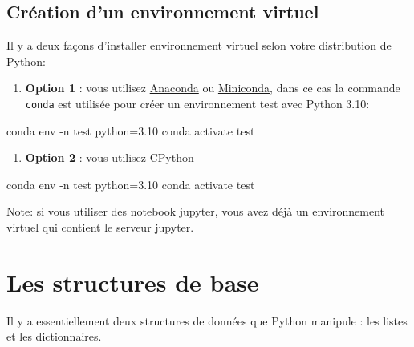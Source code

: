 \documentclass[
  letterpaper,
  DIV=11,
  numbers=noendperiod]{scrreprt}
\newenvironment{Shaded}{\begin{snugshade}}{\end{snugshade}}
\newcommand{\AttributeTok}[1]{\textcolor[rgb]{0.40,0.45,0.13}{#1}}
\newcommand{\ExtensionTok}[1]{\textcolor[rgb]{0.00,0.23,0.31}{#1}}
\newcommand{\NormalTok}[1]{\textcolor[rgb]{0.00,0.23,0.31}{#1}}
\providecommand{\tightlist}{%
  \setlength{\itemsep}{0pt}\setlength{\parskip}{0pt}}\usepackage{longtable,booktabs,array}
\begin{document}
\subsection{Création d'un environnement
virtuel}\label{cruxe9ation-dun-environnement-virtuel}

Il y a deux façons d'installer environnement virtuel selon votre
distribution de Python:

\begin{enumerate}
\def\labelenumi{\arabic{enumi}.}
\tightlist
\item
  \textbf{Option 1} : vous utilisez
  \href{https://www.anaconda.com/download}{Anaconda} ou
  \href{https://docs.anaconda.com/miniconda/miniconda-install/}{Miniconda},
  dans ce cas la commande \texttt{conda} est utilisée pour créer un
  environnement test avec Python 3.10:
\end{enumerate}

\begin{Shaded}
\begin{Highlighting}[]
\ExtensionTok{conda}\NormalTok{ env }\AttributeTok{{-}n}\NormalTok{ test python=3.10}
\ExtensionTok{conda}\NormalTok{ activate test}
\end{Highlighting}
\end{Shaded}

\begin{enumerate}
\def\labelenumi{\arabic{enumi}.}
\setcounter{enumi}{1}
\tightlist
\item
  \textbf{Option 2} : vous utilisez
  \href{https://www.python.org/downloads/}{CPython}
\end{enumerate}

\begin{Shaded}
\begin{Highlighting}[]
\ExtensionTok{conda}\NormalTok{ env }\AttributeTok{{-}n}\NormalTok{ test python=3.10}
\ExtensionTok{conda}\NormalTok{ activate test}
\end{Highlighting}
\end{Shaded}

Note: si vous utiliser des notebook jupyter, vous avez déjà un
environnement virtuel qui contient le serveur jupyter.

\section{Les structures de base}\label{les-structures-de-base}

Il y a essentiellement deux structures de données que Python manipule :
les listes et les dictionnaires.
\end{document}
